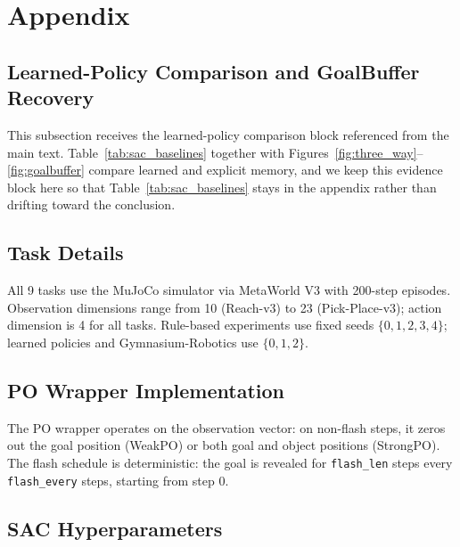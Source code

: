 \section{Appendix}
\label{sec:appendix}

\FloatBarrier

\subsection{Learned-Policy Comparison and GoalBuffer Recovery}

This subsection receives the learned-policy comparison block referenced from the main text. Table~\ref{tab:sac_baselines} together with Figures~\ref{fig:three_way}--\ref{fig:goalbuffer} compare learned and explicit memory, and we keep this evidence block here so that Table~\ref{tab:sac_baselines} stays in the appendix rather than drifting toward the conclusion.





\FloatBarrier



\subsection{Task Details}

All 9 tasks use the MuJoCo \citep{Todorov2012} simulator via MetaWorld V3 \citep{Yu2020} with 200-step episodes. Observation dimensions range from 10 (Reach-v3) to 23 (Pick-Place-v3); action dimension is 4 for all tasks. Rule-based experiments use fixed seeds $\{0,1,2,3,4\}$; learned policies and Gymnasium-Robotics use $\{0,1,2\}$.

\subsection{PO Wrapper Implementation}

The PO wrapper operates on the observation vector: on non-flash steps, it zeros out the goal position (WeakPO) or both goal and object positions (StrongPO). The flash schedule is deterministic: the goal is revealed for \texttt{flash\_len} steps every \texttt{flash\_every} steps, starting from step 0.

\subsection{SAC Hyperparameters}


